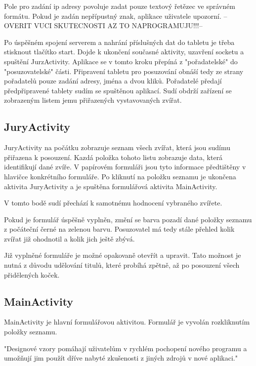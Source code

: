 \documentclass[11pt, oneside]{fithesis2}
\begin{document}
Pole pro zadání ip adresy povoluje zadat pouze textový řetězec ve správném formátu. Pokud je zadán nepřípustný znak, aplikace uživatele upozorní. --OVERIT VUCI SKUTECNOSTI AZ TO NAPROGRAMUJU!!!--

Po úspěšném spojení serverem a nahrání příslušných dat do tabletu je třeba stisknout tlačítko start. Dojde k ukončení současné aktivity, uzavření socketu a spuštění JurzActivity.
Aplikace se v tomto kroku přepíná z "pořadatelské" do "posuzovatelské" části.
Připravení tabletu pro posuzování obnáší tedy ze strany pořadatelů pouze zadání adresy, jména a dvou kliků.
Pořadatelé předají předpřipravené tablety sudím se spuštěnou aplikací. Sudí obdrží zařízení se zobrazeným listem jemu přiřazených vystavovaných zvířat.

\subsection{JuryActivity}
JuryActivity na počátku zobrazuje seznam všech zvířat, která jsou sudímu přiřazena k posouzení. Kazdá položka tohoto listu zobrazuje data, která identifikují dané zvíře.
V papírovém formuláři jsou tyto informace předtištěny v hlavičce konkrétního formuláře. Po kliknutí na položku seznamu je ukončena aktivita JuryActivity a je spuštěna formulářová aktivita MainActivity.

V tomto bodě sudí přechází k samotnému hodnocení vybraného zvířete.

Pokud je formulář úspěšně vyplněn, změní se barva pozadí dané položky seznamu z počáteční černé na zelenou barvu. Posuzovatel má tedy stále přehled kolik zvířat již ohodnotil a kolik jich ještě zbývá.

Již vyplněné formuláře je možné opakovaně otevřít a upravit. Tato možnost je nutná z důvodu udělování titulů, které probíhá zpětně, až po posouzení všech přidělených koček. 

\subsection{MainActivity}
MainActivity je hlavní formulářovou aktivitou. Formulář je vyvolán rozkliknutím položky seznamu. 
\linebreak

"Designové vzory pomáhají uživatelům v rychlém pochopení nového programu a umožňují jim použít dříve nabyté zkušenosti z jiných zdrojů v nové aplikaci."\cite[str. 172]{hoekman}
\linebreak
\end{document}
